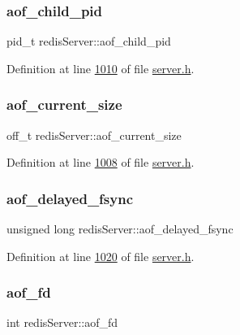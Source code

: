 \subsubsection{\texorpdfstring{aof\+\_\+child\+\_\+pid}{aof\_child\_pid}}
{\footnotesize\ttfamily pid\+\_\+t redis\+Server\+::aof\+\_\+child\+\_\+pid}



Definition at line \hyperlink{server_8h_source_l01010}{1010} of file \hyperlink{server_8h_source}{server.\+h}.

\mbox{\label{structredisServer_a1abbf5d317a89086cdff3caad5af2432}} 
\subsubsection{\texorpdfstring{aof\+\_\+current\+\_\+size}{aof\_current\_size}}
{\footnotesize\ttfamily off\+\_\+t redis\+Server\+::aof\+\_\+current\+\_\+size}



Definition at line \hyperlink{server_8h_source_l01008}{1008} of file \hyperlink{server_8h_source}{server.\+h}.

\mbox{\label{structredisServer_a2f1c197d7a48183d9bda5fb46b166337}} 
\subsubsection{\texorpdfstring{aof\+\_\+delayed\+\_\+fsync}{aof\_delayed\_fsync}}
{\footnotesize\ttfamily unsigned long redis\+Server\+::aof\+\_\+delayed\+\_\+fsync}



Definition at line \hyperlink{server_8h_source_l01020}{1020} of file \hyperlink{server_8h_source}{server.\+h}.

\mbox{\label{structredisServer_a17b841ec158b1c01425f0e84a687aeef}} 
\subsubsection{\texorpdfstring{aof\+\_\+fd}{aof\_fd}}
{\footnotesize\ttfamily int redis\+Server\+::aof\+\_\+fd}



